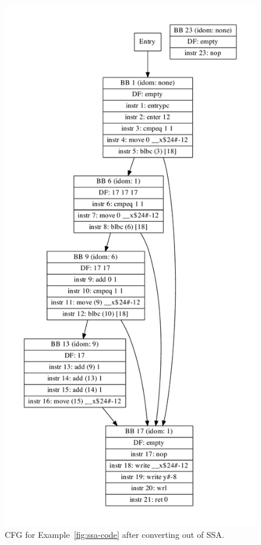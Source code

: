 \documentclass[10pt,twocolumn]{article}
\begin{document}
\begin{figure}
\begin{center}
  \includegraphics[width=0.95\columnwidth]{figs/simple6-postssa.pdf}
\begin{minipage}{0.95\columnwidth}
  \caption{\label{fig:postssa} CFG for Example~\ref{fig:ssa-code} after converting out of SSA.}
\end{minipage}
\end{center}
\end{figure}
\end{document}
